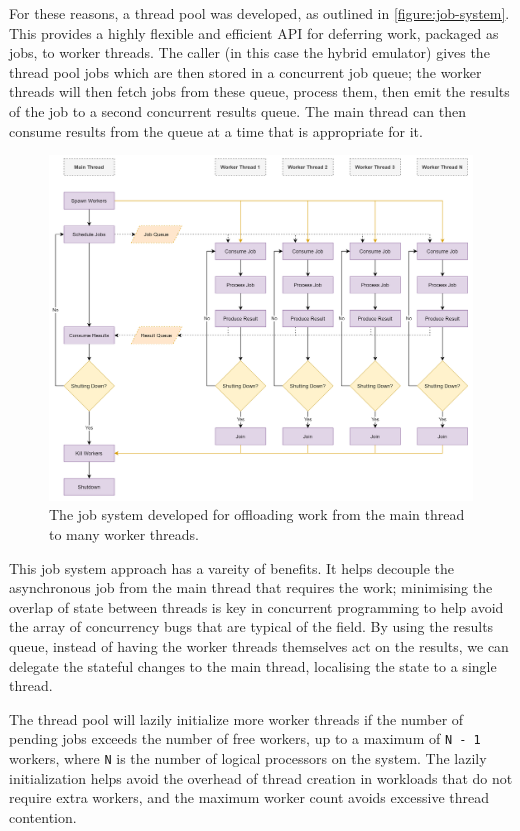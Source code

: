 For these reasons, a thread pool was developed, as outlined in \autoref{figure:job-system}. This provides a highly flexible and efficient API for deferring work, packaged as jobs, to worker threads. The caller (in this case the hybrid emulator) gives the thread pool jobs which are then stored in a concurrent job queue; the worker threads will then fetch jobs from these queue, process them, then emit the results of the job to a second concurrent results queue. The main thread can then consume results from the queue at a time that is appropriate for it.

\begin{figure}[h]
    \centering
    \includegraphics[width=1\linewidth]{diagrams/thread-pool.png}
    \caption{The job system developed for offloading work from the main thread to many worker threads.}
    \label{figure:job-system}
\end{figure}

This job system approach has a vareity of benefits. It helps decouple the asynchronous job from the main thread that requires the work; minimising the overlap of state between threads is key in concurrent programming to help avoid the array of concurrency bugs that are typical of the field. By using the results queue, instead of having the worker threads themselves act on the results, we can delegate the stateful changes to the main thread, localising the state to a single thread.

The thread pool will lazily initialize more worker threads if the number of pending jobs exceeds the number of free workers, up to a maximum of \texttt{N - 1} workers, where \texttt{N} is the number of logical processors on the system. The lazily initialization helps avoid the overhead of thread creation in workloads that do not require extra workers, and the maximum worker count avoids excessive thread contention.


